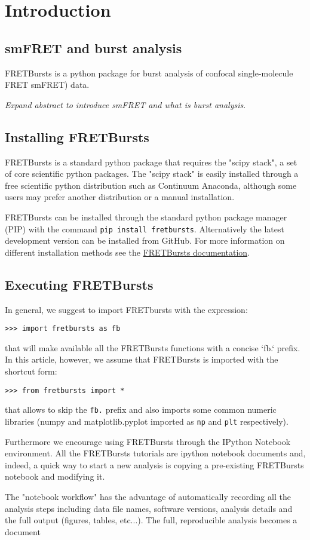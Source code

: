 \section{Introduction}

\subsection{smFRET and burst analysis}

FRETBursts is a python package for burst analysis of confocal single-molecule
FRET smFRET) data.

\textit{Expand abstract to introduce smFRET and what is burst analysis}.

\subsection{Installing FRETBursts}
FRETBursts is a standard python package that requires the "scipy stack", a set
of core 
scientific python packages.
The "scipy stack" is easily installed through a free scientific python
distribution such as Continuum Anaconda, although some users may prefer another
distribution or a manual installation.

FRETBursts can be installed through the standard python package manager (PIP)
with 
the command \texttt{pip install fretbursts}. Alternatively the latest
development version can be installed from GitHub.
For more information on different installation methods see the
\href{http://fretbursts.readthedocs.org/en/latest/installation.html}{FRETBursts
documentation}.

\subsection{Executing FRETBursts}
In general, we suggest to import FRETbursts with the expression:

\begin{verbatim}
>>> import fretbursts as fb
\end{verbatim}

that will make available all the FRETBursts functions with a concise `fb.`
prefix. In this article, however, we assume that FRETBursts is imported with the
shortcut form:

\begin{verbatim}
>>> from fretbursts import *
\end{verbatim}

that allows to skip the \verb|fb.| prefix and also imports some common numeric
libraries (numpy and matplotlib.pyplot imported as \verb|np| and \verb|plt|
respectively).

Furthermore we encourage using FRETBursts through the IPython Notebook
environment. All the FRETBursts tutorials are ipython notebook documents and,
indeed, a quick way to start a new analysis is copying a pre-existing FRETBursts
notebook and modifying it.

The "notebook workflow"\cite{Shen_2014} has the advantage of automatically
recording all the analysis steps including
data file names, software versions, analysis details and the full output
(figures, tables, etc...). The full, reproducible analysis becomes a document 



